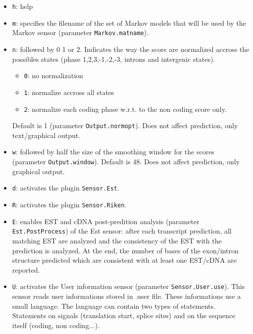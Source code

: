 \documentclass[a4paper,titlepage]{report}
\begin{document}
\begin{itemize}
\item \texttt{h}: help
  
\item \texttt{m}: specifies the filename of the set of Markov models that will
  be used by the Markov sensor (parameter \texttt{Markov.matname}).

\item \texttt{n}: followed by 0 1 or 2. Indicates the way the score are
  normalized accross the possibles states (phase 1,2,3,-1,-2,-3,
  introns and intergenic states). 
  \begin{itemize}
  \item \texttt{0}: no normalization
  \item \texttt{1}: normalize accross all states
  \item \texttt{2}: normalize each coding phase w.r.t. to the non coding
    score only.
  \end{itemize}
  Default is 1 (parameter \texttt{Output.normopt}). Does not affect
  prediction, only text/graphical output.
  
\item \texttt{w}: followed by half the size of the smoothing window for the
  scores (parameter \texttt{Output.window}). Default is 48. Does not
  affect prediction, only graphical output.
 
\item \texttt{d}: activates the plugin \texttt{Sensor.Est}.
  
\item \texttt{R}: activates the plugin \texttt{Sensor.Riken}.
  
\item \texttt{E}: enables EST and cDNA post-predition analysis (parameter
  \texttt{Est.PostProcess}) of the Est sensor: after each transcript
  prediction, all matching EST are analyzed and the consistency of the
  EST with the prediction is analyzed. At the end, the number of bases
  of the exon/intron structure predicted which are consistent with at
  least one EST/cDNA are reported.
  
\item \texttt{U}: activates the User information sensor (parameter
  \texttt{Sensor.User.use}). This sensor reads user informations
  stored in .user file. These informations use a small language. The
  language can contain two types of statements. Statements on signals
  (translation start, splice sites) and on the sequence itself
  (coding, non coding...).
  

\end{itemize}
\end{document}
